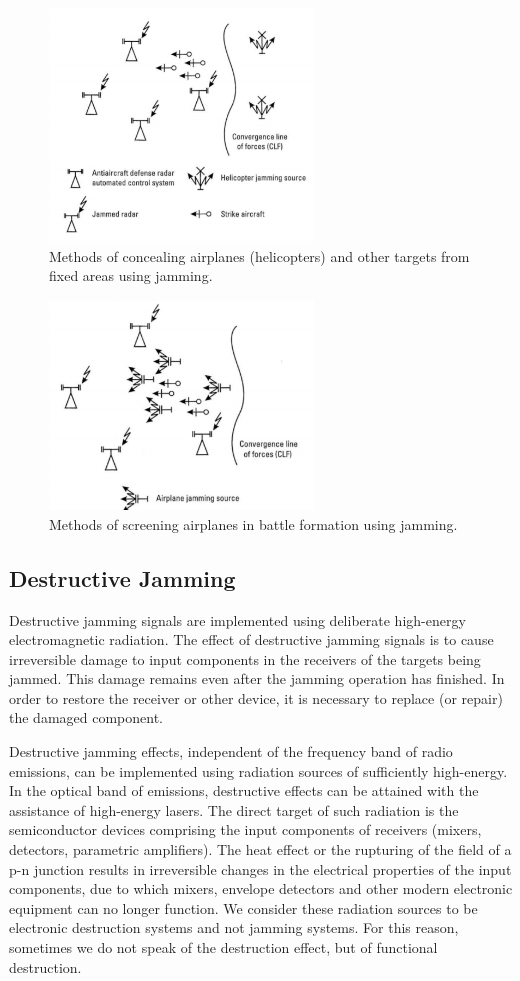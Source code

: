 \documentclass[english,purist]{ist-report}
\begin{document}
\begin{figure}[ht]
\centering
\includegraphics[width=70mm]{jam2.png}
\caption{Methods of concealing airplanes (helicopters) and other targets from fixed areas using jamming.}
\label{jam2}
\end{figure} 

\begin{figure}[ht]
\centering
\includegraphics[width=70mm]{jam3.png}
\caption{Methods of screening airplanes in battle formation using jamming.}
\label{jam3}
\end{figure} 

\subsection{Destructive Jamming}
Destructive jamming signals are implemented using deliberate high-energy electromagnetic radiation. The effect of destructive jamming signals is to cause irreversible damage to input components in the receivers of the targets being jammed. This damage remains even after the jamming operation has finished. In order to restore the receiver or other device, it is necessary to replace (or repair) the damaged component. 

Destructive jamming effects, independent of the frequency band of radio emissions, can be implemented using radiation sources of sufficiently high-energy.  In the optical band of emissions, destructive effects can be attained with the assistance of high-energy lasers. The direct target of such radiation is the
semiconductor devices comprising the input components of receivers
(mixers, detectors, parametric amplifiers). The heat effect or the rupturing of the field of a p-n junction results in irreversible changes in the electrical properties of the input components, due to which mixers, envelope detectors and other modern electronic equipment can no longer function. We consider these radiation sources to be electronic destruction systems and not jamming systems. For this reason, sometimes we do not speak of the destruction effect, but of functional destruction.
\end{document}
